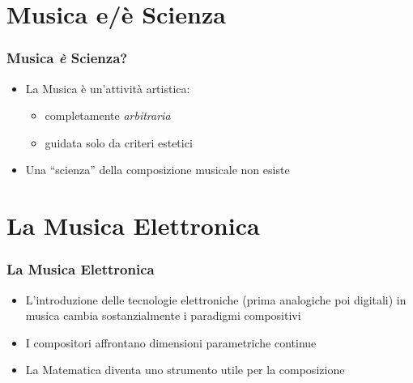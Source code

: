 \documentclass[mode=\printmode,compress,xcolor=dvipsnames]{beamer}
\begin{document}
\section{Musica e/\`e Scienza}

\begin{frame}
   \frametitle<+->{Musica \emph{\`e} Scienza?}

   \begin{itemize}[<+->]
      \item La Musica \`e un'attivit\`a artistica:
        \begin{itemize}[<+->]
           \item completamente \emph{arbitraria}
           \item guidata solo da criteri estetici
        \end{itemize}
     \item Una ``scienza'' della composizione musicale non esiste
   \end{itemize}


\end{frame}

\section{La Musica Elettronica}

\begin{frame}
   \frametitle<+->{La Musica Elettronica}

   \begin{itemize}[<+->]

      \item L'introduzione delle tecnologie elettroniche (prima analogiche poi
              digitali) in musica cambia sostanzialmente i paradigmi
              compositivi

      \item I compositori affrontano dimensioni parametriche continue

      \item La Matematica diventa uno strumento utile per la composizione

   \end{itemize}


\end{frame}
\end{document}
